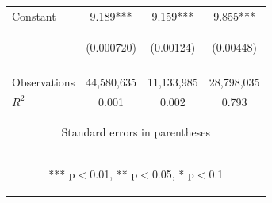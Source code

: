 \documentclass[]{article}
\begin{document}
\begin{center}
\begin{tabular}{lccc}
Constant & 9.189*** & 9.159*** & 9.855*** \\
 & \begin{footnotesize}(0.000720)\end{footnotesize} & \begin{footnotesize}(0.00124)\end{footnotesize} & \begin{footnotesize}(0.00448)\end{footnotesize} \\
\vspace{4pt} & \begin{footnotesize}\end{footnotesize} & \begin{footnotesize}\end{footnotesize} & \begin{footnotesize}\end{footnotesize} \\
Observations & 44,580,635 & 11,133,985 & 28,798,035 \\
 $R^2$ & 0.001 & 0.002 & 0.793 \\ \hline
\multicolumn{4}{c}{\begin{footnotesize} Standard errors in parentheses\end{footnotesize}} \\
\multicolumn{4}{c}{\begin{footnotesize} *** p$<$0.01, ** p$<$0.05, * p$<$0.1\end{footnotesize}} \\
\end{tabular}
\end{center}
\end{document}
